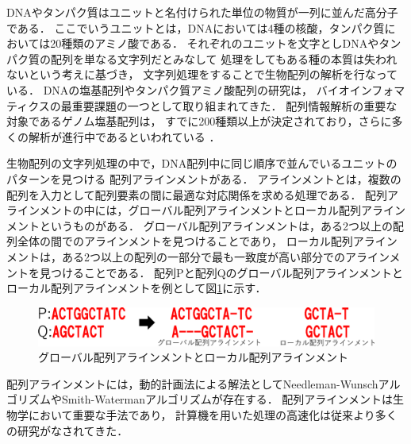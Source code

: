 DNAやタンパク質はユニットと名付けられた単位の物質が一列に並んだ高分子である．
ここでいうユニットとは，DNAにおいては4種の核酸，タンパク質においては20種類のアミノ酸である．
それぞれのユニットを文字としDNAやタンパク質の配列を単なる文字列だとみなして
処理をしてもある種の本質は失われないという考えに基づき，
文字列処理をすることで生物配列の解析を行なっている．
DNAの塩基配列やタンパク質アミノ酸配列の研究は，
バイオインフォマティクスの最重要課題の一つとして取り組まれてきた．
配列情報解析の重要な対象であるゲノム塩基配列は，
すでに200種類以上が決定されており，さらに多くの解析が進行中であるといわれている
\cite{浅井潔2005バイオインフォマティクス}．

生物配列の文字列処理の中で，DNA配列中に同じ順序で並んでいるユニットのパターンを見つける
配列アラインメントがある\cite{須戸里織2011バイオインフォマティクスゲノム配列から
機能解析へバイオインフォマティクスゲノム配列から機能解析へ}．
アラインメントとは，複数の配列を入力として配列要素の間に最適な対応関係を求める処理である．
配列アラインメントの中には，グローバル配列アラインメントとローカル配列アラインメントというものがある．
グローバル配列アラインメントは，ある2つ以上の配列全体の間でのアラインメントを見つけることであり，
ローカル配列アラインメントは，ある2つ以上の配列の一部分で最も一致度が高い部分でのアラインメントを見つけることである．
配列Pと配列Qのグローバル配列アラインメントとローカル配列アラインメントを例として図\ref{fig:grlc}に示す．
\begin{figure}[t!]
\begin{center}
\includegraphics[keepaspectratio,scale=0.5]{fig/2/grlc.eps}
\caption{グローバル配列アラインメントとローカル配列アラインメント}
\label{fig:grlc}
\end{center}
\end{figure}

配列アラインメントには，動的計画法による解法としてNeedleman-Wunschアルゴリズム\cite{needleman1970general}やSmith-Watermanアルゴリズム\cite{smith1981identification}が存在する．
配列アラインメントは生物学において重要な手法であり，
計算機を用いた処理の高速化は従来より多くの研究がなされてきた\cite{須戸里織2011gpu,宗川裕馬2008統合開発環境,sandes2011smith,liu2015accelerating,伊野文彦2007gpu}．


